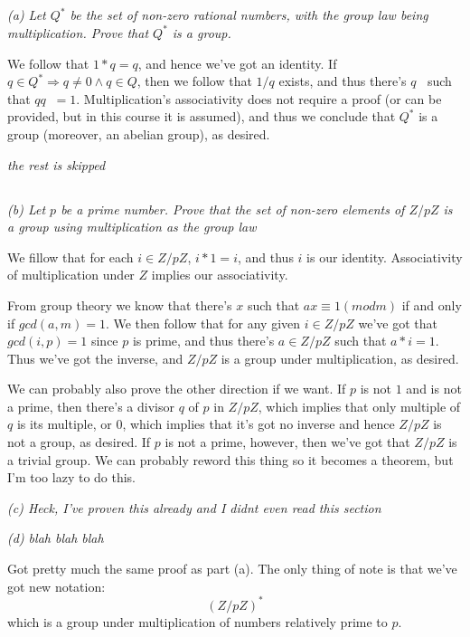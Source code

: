 \documentclass[11pt,oneside,titlepage]{book}
\DeclareMathOperator \inv {^{-1}}
\DeclareMathOperator \ra {\Rightarrow}
\begin{document}
\subsection{}

\textit{(a) Let $Q^*$ be the set of non-zero rational numbers, with
the group law being multiplication. Prove that $Q^*$ is a group.}

We follow that $1 * q = q$, and hence we've got an identity.  If $q
\in Q^* \ra q \neq 0 \land q \in Q$, then we follow that $1/q$ exists,
and thus there's $q\inv$ such that $q q\inv = 1$. Multiplication's
associativity does not require a proof (or can be provided, but in
this course it is assumed), and thus we conclude that $Q^*$ is a group
(moreover, an abelian group), as desired.

\textit{the rest is skipped}

\subsection{}

\textit{(b) Let $p$ be a prime number. Prove that the set of non-zero
elements of $Z/pZ$ is a group using multiplication as the group law}

We fillow that for each $i \in Z/pZ$, $i * 1 = i$, and thus $i$ is our
identity. Associativity of multiplication under $Z$ implies our
associativity.

From group theory we know that there's $x$ such that $ax \equiv 1 (mod
m)$ if and only if $gcd(a, m) = 1$.  We then follow that for any given
$i \in Z/pZ$ we've got that $gcd(i, p) = 1$ since $p$ is prime, and
thus there's $a \in Z/pZ$ such that $a * i = 1$. Thus we've got the
inverse, and $Z/pZ$ is a group under multiplication, as desired.

We can probably also prove the other direction if we want. If $p$ is
not $1$ and is not a prime, then there's a divisor $q$ of $p$ in
$Z/pZ$, which implies that only multiple of $q$ is its multiple, or
$0$, which implies that it's got no inverse and hence $Z/pZ$ is not a
group, as desired. If $p$ is not a prime, however, then we've got that
$Z/pZ$ is a trivial group. We can probably reword this thing so it
becomes a theorem, but I'm too lazy to do this.

\textit{(c) Heck, I've proven this already and I didnt even read this
section}

\textit{(d) blah blah blah}

Got pretty much the same proof as part (a). The only thing of note is
that we've got new notation:
$$(Z/pZ)^*$$
which is a group under multiplication of numbers relatively prime to
$p$.
\end{document}

